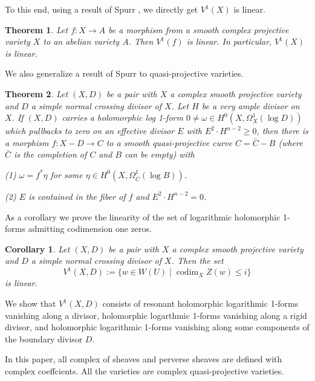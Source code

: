 \documentclass[11pt,reqno]{amsart}
\newtheorem{corollary}[theorem]{Corollary}
\newtheorem{alphtheorem}{Theorem}
\theoremstyle{definition}
\theoremstyle{remark}
\theoremstyle{cited}
\theoremstyle{citeddef}
\DeclareMathOperator{\codim}{codim}              %
\begin{document}
To this end, using a result of Spurr \cite{Sp88}, we directly get $V^1(X)$ is linear.

\begin{alphtheorem}
Let $f: X\to A$ be a morphism from a smooth complex projective variety $X$ to an abelian variety $A$. Then $V^1(f)$ is linear. In particular, $V^1(X)$ is linear.
\end{alphtheorem}


We also generalize a result of Spurr \cite{Sp88} to quasi-projective varieties. 

\begin{alphtheorem} \label{log-linear-v1}
Let $(X, D)$ be a pair with $X$ a complex smooth projective variety and $D$ a simple normal crossing divisor of $X$. Let $H$ be a very ample divisor on $X$. If $(X, D)$ carries a holomorphic log 1-form $0\not=\omega\in H^0(X, \Omega_X^1(\log D))$  which pullbacks to zero on an effective divisor $E$ with $E^2\cdot H^{n-2}\geq0$, then there is a morphism $f: X-D\to C$ to a smooth quasi-projective curve $C=\bar{C}-B$ (where $\bar{C}$ is the completion of $C$ and $B$ can be empty) with 

(1)  $\omega=f^*\eta$ for some $\eta\in H^0(X, \Omega_{\bar{C}}^1(\log B))$.

(2) $E$ is contained in the fiber of $f$ and $E^2\cdot H^{n-2}=0$.
\end{alphtheorem}

As a corollary we prove the linearity of the set of logarithmic holomorphic 1-forms admitting codimension one zeros.

\begin{corollary}
Let $(X, D)$ be a pair with $X$ a complex smooth projective variety and $D$ a simple normal crossing divisor of $X$. Then the set $$ V^1(X,D):=\{ w \in W(U) \mid \codim_X Z(w) \leq i \}$$ is linear.
\end{corollary}

We show that $V^1(X,D)$ consists of resonant holomorphic logarithmic 1-forms vanishing along a divisor, holomorphic logarthmic 1-forms vanishing along a rigid divisor, and holomorphic logarithmic 1-forms vanishing along some components of the boundary divisor $D$.


In this paper, all complex of sheaves and perverse sheaves are defined with complex
coeffcients. All the varieties are complex quasi-projective varieties. 
\end{document}

